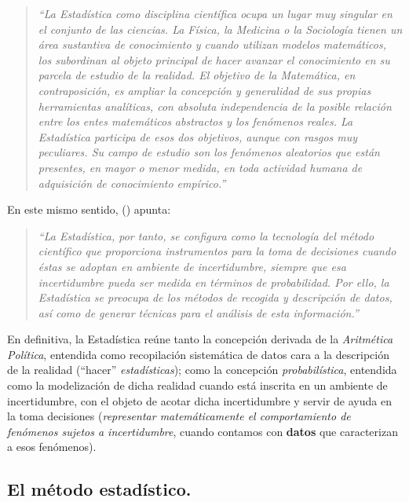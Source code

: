 \documentclass[
]{book}
\begin{document}
\begin{quote}
\emph{``La Estadística como disciplina científica ocupa un lugar muy singular en el conjunto de las ciencias. La Física, la Medicina o la Sociología tienen un área sustantiva de conocimiento y cuando utilizan modelos matemáticos, los subordinan al objeto principal de hacer avanzar el conocimiento en su parcela de estudio de la realidad. El objetivo de la Matemática, en contraposición, es ampliar la concepción y generalidad de sus propias herramientas analíticas, con absoluta independencia de la posible relación entre los entes matemáticos abstractos y los fenómenos reales. La Estadística participa de esos dos objetivos, aunque con rasgos muy peculiares. Su campo de estudio son los fenómenos aleatorios que están presentes, en mayor o menor medida, en toda actividad humana de adquisición de conocimiento empírico.''}
\end{quote}

En este mismo sentido, () apunta:

\begin{quote}
\emph{``La Estadística, por tanto, se configura como la tecnología del método científico que proporciona instrumentos para la toma de decisiones cuando éstas se adoptan en ambiente de incertidumbre, siempre que esa incertidumbre pueda ser medida en términos de probabilidad. Por ello, la Estadística se preocupa de los métodos de recogida y descripción de datos, así como de generar técnicas para el análisis de esta información.''}
\end{quote}

En definitiva, la Estadística reúne tanto la concepción derivada de la \emph{Aritmética Política}, entendida como recopilación sistemática de datos cara a la descripción de la realidad (``hacer'' \emph{estadísticas}); como la concepción \emph{probabilística}, entendida como la modelización de dicha realidad cuando está inscrita en un ambiente de incertidumbre, con el objeto de acotar dicha incertidumbre y servir de ayuda en la toma decisiones (\emph{representar matemáticamente el comportamiento de fenómenos sujetos a incertidumbre}, cuando contamos con \textbf{datos} que caracterizan a esos fenómenos).

\subsection{El método estadístico.}\label{el-muxe9todo-estaduxedstico.}
\end{document}
